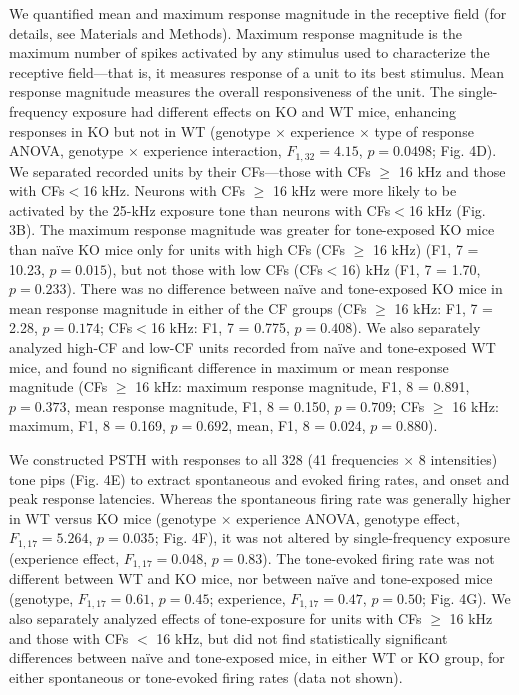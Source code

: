 We quantified mean and maximum response magnitude in the receptive field (for details, see Materials and Methods). Maximum response magnitude is the maximum number of spikes activated by any stimulus used to characterize the receptive field---that is, it measures response of a unit to its best stimulus. Mean response magnitude measures the overall responsiveness of the unit. The single-frequency exposure had different effects on KO and WT mice, enhancing responses in KO but not in WT (genotype $\times$ experience $\times$ type of response ANOVA, genotype $\times$ experience interaction, $F_{1,32}=4.15$, $p=0.0498$; Fig. 4D). We separated recorded units by their CFs---those with CFs $\ge$ 16 kHz and those with CFs$<$16 kHz. Neurons with CFs $\ge$ 16 kHz were more likely to be activated by the 25-kHz exposure tone than neurons with CFs$<$16 kHz (Fig. 3B). The maximum response magnitude was greater for tone-exposed KO mice than na\"ive KO mice only for units with high CFs (CFs $\ge$ 16 kHz) (F1, 7 = 10.23, $p=0.015$), but not those with low CFs (CFs$<$16) kHz (F1, 7 = 1.70, $p=0.233$). There was no difference between na\"ive and tone-exposed KO mice in mean response magnitude in either of the CF groups (CFs $\ge$ 16 kHz: F1, 7 = 2.28, $p=0.174$; CFs$<$16 kHz: F1, 7 = 0.775, $p=0.408$). We also separately analyzed high-CF and low-CF units recorded from na\"ive and tone-exposed WT mice, and found no significant difference in maximum or mean response magnitude (CFs $\ge$ 16 kHz: maximum response magnitude, F1, 8 = 0.891, $p=0.373$, mean response magnitude, F1, 8 = 0.150, $p=0.709$; CFs $\ge$ 16 kHz: maximum, F1, 8 = 0.169, $p=0.692$, mean, F1, 8 = 0.024, $p=0.880$).

We constructed PSTH with responses to all 328 (41 frequencies $\times$ 8 intensities) tone pips (Fig. 4E) to extract spontaneous and evoked firing rates, and onset and peak response latencies. Whereas the spontaneous firing rate was generally higher in WT versus KO mice (genotype $\times$ experience ANOVA, genotype effect, $F_{1,17}=5.264$, $p=0.035$; Fig. 4F), it was not altered by single-frequency exposure (experience effect, $F_{1,17}=0.048$, $p=0.83$). The tone-evoked firing rate was not different between WT and KO mice, nor between na\"ive and tone-exposed mice (genotype, $F_{1,17}=0.61$, $p=0.45$; experience, $F_{1,17}=0.47$, $p=0.50$; Fig. 4G). We also separately analyzed effects of tone-exposure for units with CFs $\ge$ 16 kHz and those with CFs $<$ 16 kHz, but did not find statistically significant differences between na\"ive and tone-exposed mice, in either WT or KO group, for either spontaneous or tone-evoked firing rates (data not shown).

